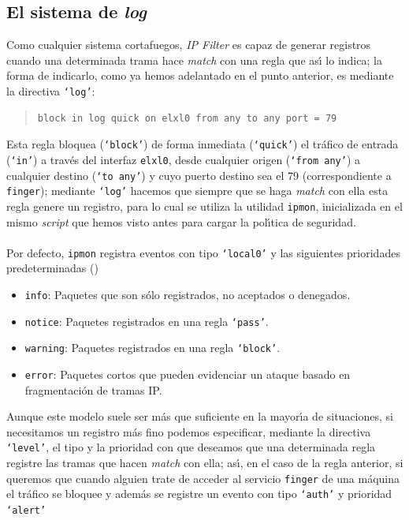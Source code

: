 \subsection{El sistema de {\it log}}
Como cualquier sistema cortafuegos, {\it IP Filter} es capaz de generar 
registros cuando una determinada trama hace {\it match} con una regla que
as\'{\i} lo indica; la forma de indicarlo, como ya hemos adelantado en el
punto anterior, es mediante la directiva {\tt `log'}:
\begin{quote}
\begin{verbatim}
block in log quick on elxl0 from any to any port = 79
\end{verbatim}
\end{quote}
Esta regla bloquea ({\tt `block'}) de forma inmediata ({\tt `quick'}) el 
tr\'afico de entrada ({\tt `in'}) a trav\'es del interfaz {\tt elxl0}, desde
cualquier origen ({\tt `from any'}) a cualquier destino ({\tt `to any'}) y cuyo
puerto destino sea el 79 (correspondiente a {\tt finger}); mediante {\tt `log'}
hacemos que siempre que se haga {\it match} con ella esta regla genere un
registro, para lo cual se utiliza la utilidad {\tt ipmon}, inicializada en el
mismo {\it script} que hemos visto antes para cargar la pol\'{\i}tica de 
seguridad.\\
\\Por defecto, {\tt ipmon} registra eventos con tipo {\tt `local0'} y las
siguientes prioridades predeterminadas (\cite{kn:mcc00})
\begin{itemize}
\item {\tt info}: Paquetes que son s\'olo registrados, no aceptados o denegados.
\item {\tt notice}: Paquetes registrados en una regla {\tt `pass'}. 
\item {\tt warning}: Paquetes registrados en una regla {\tt `block'}. 
\item {\tt error}: Paquetes cortos que pueden evidenciar un ataque basado en
fragmentaci\'on de tramas IP.
\end{itemize}
Aunque este modelo suele ser m\'as que suficiente en la mayor\'{\i}a de
situaciones, si necesitamos un registro m\'as fino podemos especificar, 
mediante la directiva {\tt `level'}, el tipo y la prioridad con que deseamos que
una determinada regla registre las tramas que hacen {\it match} con ella; 
as\'{\i}, en el caso de la regla anterior, si queremos que cuando alguien trate
de acceder al servicio {\tt finger} de una m\'aquina el tr\'afico se bloquee y
adem\'as se registre un evento con tipo {\tt `auth'} y prioridad {\tt `alert'}
